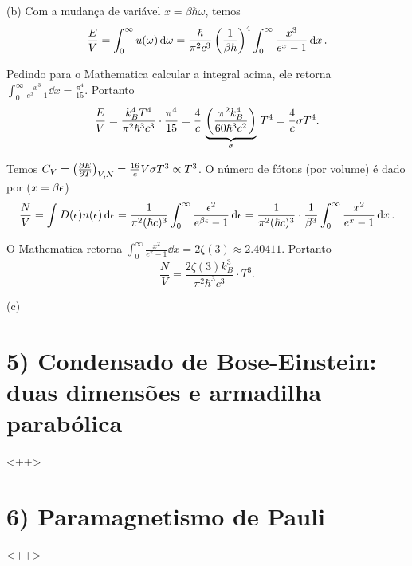 \documentclass[a4paper,10pt]{article}
\begin{document}
(b) Com a mudança de variável $x = \beta \hbar\omega$, temos
$$
\frac{E}{V} = \int_0^\infty u(\omega) \dd{\omega} = \frac{\hbar}{\pi^2 c^3} \,
\qty(\frac{1}{\beta\hbar})^4 \int_0^\infty \frac{x^3}{e^{x} - 1} \dd{x}.
$$

Pedindo para o Mathematica calcular a integral acima, ele retorna $\int_0^\infty \frac{x^3}{e^{x} - 1} \dd{x} = \frac{\pi^4}{15}$. Portanto
$$
\frac{E}{V} = \frac{k_B^4 T^4}{\pi^2 \hbar^3 c^3} \cdot \frac{\pi^4}{15} =
\frac{4}{c} \, \underbrace{\qty(\frac{\pi^2 k_B^4}{60 \hbar^3 c^2})}_{\sigma} \, T^4 = \frac{4}{c} \sigma T^4.
$$

Temos $C_V = \qty(\pdv{E}{T})_{V,N} = \frac{16}{c} V \sigma T^3 \propto T^3$. O número de fótons (por volume) é dado por ($x = \beta \epsilon$)
$$
\frac{N}{V} = \int D(\epsilon) n(\epsilon) \dd{\epsilon} =
\frac{1}{\pi^2 (\hbar c)^3} \int_0^{\infty} \frac{\epsilon^2}{e^{\beta \epsilon}-1} \dd{\epsilon} =
\frac{1}{\pi^2 (\hbar c)^3} \cdot \frac{1}{\beta^3} \int_0^\infty \frac{x^2}{e^x - 1} \dd{x}.
$$

O Mathematica retorna $\int_0^\infty \frac{x^2}{e^x - 1} \dd{x} = 2 \zeta(3) \approx 2.40411$. Portanto
$$
\frac{N}{V} = \frac{2 \zeta(3) k_B^3}{\pi^2 \hbar^3 c^3} \cdot T^3.
$$

\n

(c)


\pagebreak

\section*{5) Condensado de Bose-Einstein: duas dimensões e armadilha parabólica}

<++>

\pagebreak

\section*{6) Paramagnetismo de Pauli}

<++>

\pagebreak
\end{document}
